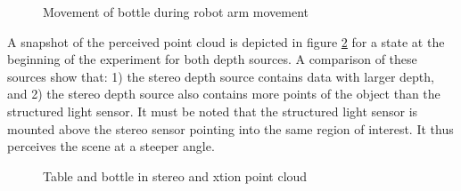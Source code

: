 \begin{figure}
\centering
{}
\caption{Movement of bottle during robot arm movement}
\label{fig:bottle_movement}
\end{figure}

A snapshot of the perceived point cloud is depicted in figure \ref{fig:bottle_point_cloud} for a state at the beginning of the experiment for both depth sources. A comparison of these sources show that: 1) the stereo depth source contains data with larger depth, and 2) the stereo depth source also contains more points of the object than the structured light sensor. It must be noted that the structured light sensor is mounted above the stereo sensor pointing into the same region of interest. It thus perceives the scene at a steeper angle.

\begin{figure}
\centering
{}
\hspace{1cm}
\caption{Table and bottle in stereo and xtion point cloud}
\label{fig:bottle_point_cloud}
\end{figure}


